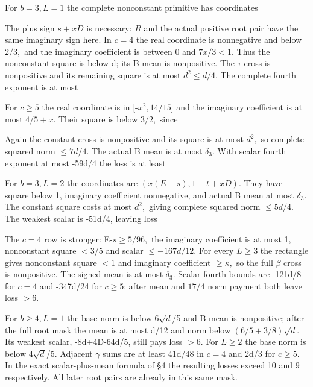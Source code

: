 For \(b=3,\allowbreak \allowbreak  L=1\) the complete nonconstant primitive has coordinates



The plus sign \(s+xD\) is necessary: \(\bar R\) and the actual positive root pair have the same imaginary sign here. In \(c=4\) the real coordinate is nonnegative and below \(2/3,\allowbreak \) and the imaginary coefficient is between 0 and \(7x/3<1.\) Thus the nonconstant square is below d; its B mean is nonpositive. The \(\tau\) cross is nonpositive and its remaining square is at most \(d^2\le d/4.\) The complete fourth exponent is at most



For \(c\ge 5\) the real coordinate is in [-\(x^2,\allowbreak  14/15\)] and the imaginary coefficient is at most \(4/5+x.\) Their square is below \(3/2,\allowbreak \) since



Again the constant cross is nonpositive and its square is at most \(d^2,\allowbreak \) so complete squared norm \(\le 7d/4.\) The actual B mean is at most \(\delta_3\). With scalar fourth exponent at most -59d/4 the loss is at least



For \(b=3,\allowbreak \allowbreak  L=2\) the coordinates are \((x(E-s),\allowbreak \allowbreak  1-t+xD)\). They have square below 1, imaginary coefficient nonnegative, and actual B mean at most \(\delta_3\). The constant square costs at most \(d^2,\allowbreak \) giving complete squared norm \(\le 5d/4.\) The weakest scalar is -51d/4, leaving loss



The \(c=4\) row is stronger: E-\(s\ge 5/96,\allowbreak \allowbreak  \) the imaginary coefficient is at most 1, nonconstant square \(<3/5\) and scalar \(\le -167d/12.\) For every \(L\ge 3\) the rectangle gives nonconstant square \(<1\) and imaginary coefficient \(\ge \kappa,\allowbreak \allowbreak  \) so the full \(\beta\) cross is nonpositive. The signed mean is at most \(\delta_3\). Scalar fourth bounds are -121d/8 for \(c=4\) and -347d/24 for \(c\ge 5\); after mean and \(17/4\) norm payment both leave loss \(>6.\)

For \(b\ge 4,\allowbreak \allowbreak  L=1\) the base norm is below 6\(\sqrt{d}\)/5 and B mean is nonpositive; after the full root mask the mean is at most d/12 and norm below \((6/5+3/8)\sqrt{d}\). Its weakest scalar, -8d+4D-64d/5, still pays loss \(>6.\) For \(L\ge 2\) the base norm is below 4\(\sqrt{d}\)/5. Adjacent \(\gamma\) sums are at least 41d/48 in \(c=4\) and 2d/3 for \(c\ge 5.\) In the exact scalar-plus-mean formula of §4 the resulting losses exceed 10 and 9 respectively. All later root pairs are already in this same mask.

